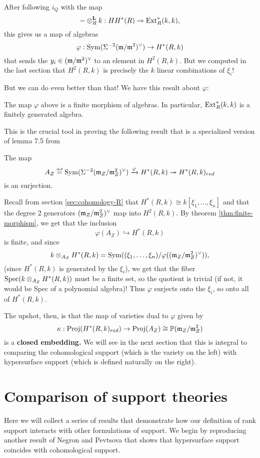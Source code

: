 \documentclass [11pt, proquest] {uwthesis}[2020/02/24]
\begin{document}
    After following $i_Q$ with the map \cite[eq. 10]{negron-pevtsovaII}
    \[-\otimes_R^\textbf{L}k:HH^\ast(R)\to \operatorname{Ext}_R^\ast(k,k),\]
    this gives us a map of algebras
    \[\varphi:\operatorname{Sym}(\Sigma^{-2}(\mathfrak{m}/\mathfrak{m}^2)^\vee)\to H^\ast(R,k)\]
    that sends the $y_i\in(\mathfrak{m}/\mathfrak{m}^2)^\vee$ to an element in $H^2(R,k).$ But we computed in the last section that $H^2(R,k)$ is precisely the $k$ linear combinations of $\xi_i!$ 
    
    But we can do even better than that! We have this result about $\varphi:$
    \begin{thm}\label{thm:finite-morphism}
        The map $\varphi$ above is a finite morphism of algebras. In particular, $\operatorname{Ext}_R^\ast(k,k)$ is a finitely generated algebra.
    \end{thm}
    This is the crucial tool in proving the following result that is a specialized version of lemma 7.5 from \cite{negron-pevtsovaII}
    \begin{lem}
        The map 
        \[A_Z\stackrel{\text{\tiny def}}{=}\operatorname{Sym}(\Sigma^{-2}(\mathfrak{m}_Z/\mathfrak{m}_Z^2)^\vee)\xrightarrow{\varphi} H^\ast(R,k)\twoheadrightarrow H^\ast(R,k)_{red}\]
        is an surjection.
    \end{lem}
    \begin{prf}
        Recall from section \ref{sec:cohomology-R} that $H^\ast(R,k)\cong k[\xi_1,\dots,\xi_n]$ and that the degree 2 generators $(\mathfrak{m}_Z/\mathfrak{m}_Z^2)^\vee$ map into $H^2(R,k).$ By theorem \ref{thm:finite-morphism}, we get that the inclusion
        \[\varphi(A_Z)\hookrightarrow H^\ast(R,k)\]
        is finite, and since 
        \[k\otimes_{A_Z}H^\ast(R,k)=\operatorname{Sym}((\xi_1,\dots,\xi_n)/\varphi((\mathfrak{m}_Z/\mathfrak{m}_Z^2)^\vee)),\]
        (since $H^\ast(R,k)$ is generated by the $\xi_i$), we get that the fiber $\operatorname{Spec}(k\otimes_{A_Z}H^\ast(R,k))$ must be a finite set, so the quotient is trivial (if not, it would be Spec of a polynomial algebra)! Thus $\varphi$ surjects onto the $\xi_i$, so onto all of $H^\ast(R,k).$
    \end{prf}
    
    The upshot, then, is that the map of varieties dual to $\varphi$ given by 
    \[\kappa:\operatorname{Proj}(H^\ast(R,k)_{red})\to \operatorname{Proj}(A_Z)\cong \mathbb{P}(\mathfrak{m}_Z/\mathfrak{m}_Z^2)\]
    is a \textbf{closed embedding.} We will see in the next section that this is integral to comparing the cohomological support (which is the variety on the left) with hypersurface support (which is defined naturally on the right).

\section{Comparison of support theories}
    Here we will collect a series of results that demonstrate how our definition of rank support interacts with other formulations of support. We begin by reproducing another result of Negron and Pevtsova that shows that hypersurface support coincides with cohomological support.
    
\end{document}
